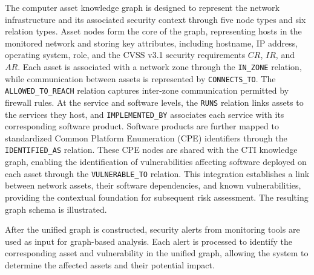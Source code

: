 \documentclass[conference]{IEEEtran}
\begin{document}
\begin{itemize}
        The computer asset knowledge graph is designed to represent the network infrastructure and its associated security context through five node types and six relation types. Asset nodes form the core of the graph, representing hosts in the monitored network and storing key attributes, including hostname, IP address, operating system, role, and the CVSS v3.1 security requirements \(CR\), \(IR\), and \(AR\). Each asset is associated with a network zone through the \texttt{IN\_ZONE} relation, while communication between assets is represented by \texttt{CONNECTS\_TO}. The \texttt{ALLOWED\_TO\_REACH} relation captures inter-zone communication permitted by firewall rules. At the service and software levels, the \texttt{RUNS} relation links assets to the services they host, and \texttt{IMPLEMENTED\_BY} associates each service with its corresponding software product. Software products are further mapped to standardized Common Platform Enumeration (CPE) identifiers through the \texttt{IDENTIFIED\_AS} relation. These CPE nodes are shared with the CTI knowledge graph, enabling the identification of vulnerabilities affecting software deployed on each asset through the \texttt{VULNERABLE\_TO} relation. This integration establishes a link between network assets, their software dependencies, and known vulnerabilities, providing the contextual foundation for subsequent risk assessment. The resulting graph schema is illustrated.

        After the unified graph is constructed, security alerts from monitoring tools are used as input for graph-based analysis. Each alert is processed to identify the corresponding asset and vulnerability in the unified graph, allowing the system to determine the affected assets and their potential impact.


\end{itemize}
\end{document}
